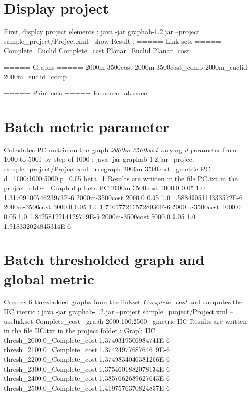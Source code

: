 \documentclass[a4paper,10pt]{report}
\newenvironment{cmd}
{\quote\Verbatim}
{\endVerbatim\endquote}
\begin{document}
\section{Display project}
First, display project elements :
\begin{cmd}
java -jar graphab-1.2.jar --project sample_project/Project.xml --show
\end{cmd}
Result :
\begin{cmd}
===== Link sets =====
Complete_Euclid
Complete_cost
Planar_Euclid
Planar_cost

===== Graphs =====
2000m-3500cost
2000m-3500cost_comp
2000m_euclid
2000m_euclid_comp

===== Point sets =====
Presence_absence
\end{cmd}

\section{Batch metric parameter}
Calculates PC metric on the graph \textit{2000m-3500cost} varying \textit{d} parameter from 1000 to 5000 by step of 1000 :
\begin{cmd}
java -jar graphab-1.2.jar --project sample_project/Project.xml 
  --usegraph 2000m-3500cost --gmetric PC d=1000:1000:5000 p=0.05 beta=1
\end{cmd}
Results are written in the file PC.txt in the project folder :
\begin{cmd}
Graph	d	p	beta	PC
2000m-3500cost	1000.0	0.05	1.0	1.3170910074623973E-6
2000m-3500cost	2000.0	0.05	1.0	1.5884005111333572E-6
2000m-3500cost	3000.0	0.05	1.0	1.7406772135728036E-6
2000m-3500cost	4000.0	0.05	1.0	1.8425812214129719E-6
2000m-3500cost	5000.0	0.05	1.0	1.918332024845314E-6
\end{cmd}

\section{Batch thresholded graph and global metric}
Creates 6 thresholded graphs from the linkset \textit{Complete\_cost} and computes the IIC metric :
\begin{cmd}
java -jar graphab-1.2.jar --project sample_project/Project.xml --uselinkset Complete_cost
  --graph 2000:100:2500 --gmetric IIC
\end{cmd}
Results are written in the file IIC.txt in the project folder :
\begin{cmd}
Graph	IIC
thresh_2000.0_Complete_cost	1.3740319506984741E-6
thresh_2100.0_Complete_cost	1.3742497768764619E-6
thresh_2200.0_Complete_cost	1.3749834046381206E-6
thresh_2300.0_Complete_cost	1.3754601882078134E-6
thresh_2400.0_Complete_cost	1.3857662689627643E-6
thresh_2500.0_Complete_cost	1.4197576370824857E-6
\end{cmd}
\end{document}
